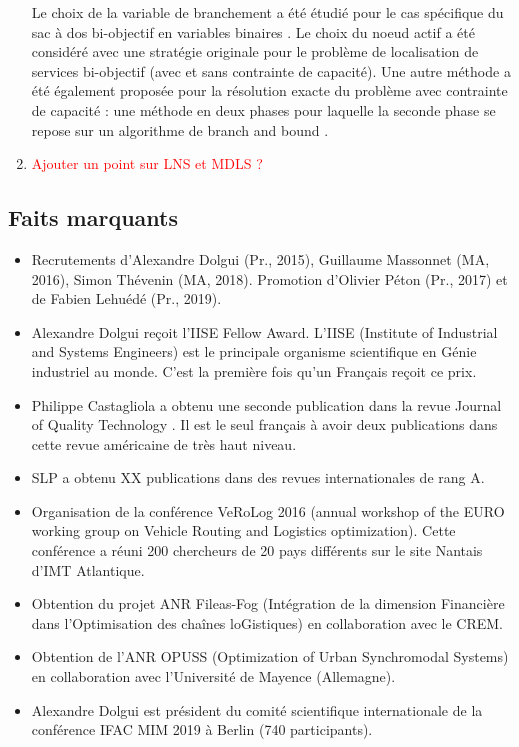 \begin{enumerate}
Le choix de la variable de branchement a été étudié pour le cas spécifique du sac à dos bi-objectif en variables binaires \cite{cerqueus:hal-01564982}. Le choix du noeud actif a été considéré avec une stratégie originale pour le problème de localisation de services bi-objectif \cite{delmee:hal-01435524} (avec et sans contrainte de capacité). Une autre méthode a  été également proposée pour la résolution exacte du problème avec contrainte de capacité : une méthode en deux phases pour laquelle la seconde phase se repose sur un algorithme de branch and bound \cite{delmee:hal-02480176}. 

\item \textcolor{red}{Ajouter un point sur LNS et MDLS ?}
\end{enumerate}

  		
\subsection{Faits marquants}



\begin{itemize}
    \item Recrutements d'Alexandre Dolgui (Pr., 2015), Guillaume  Massonnet (MA, 2016), Simon  Thévenin (MA, 2018). Promotion  d'Olivier Péton (Pr., 2017) et de Fabien Lehuédé (Pr., 2019).
    \item Alexandre Dolgui reçoit l'IISE Fellow Award. L'IISE (Institute of Industrial and Systems Engineers) est le principale organisme scientifique en Génie industriel au monde. C'est la première fois qu'un Français reçoit ce prix.
    \item Philippe Castagliola a obtenu une seconde publication dans la revue Journal of Quality Technology \cite{castagliola:hal-02002980}. Il est le seul français à avoir deux publications dans cette revue américaine de très haut niveau.
    \item SLP a obtenu XX publications  dans des revues internationales de rang A.
    \item Organisation de la conférence VeRoLog 2016 (annual workshop of the EURO working group on Vehicle Routing and Logistics optimization). Cette conférence a réuni 200 chercheurs de 20 pays différents sur le site Nantais d'IMT Atlantique. 
    \item Obtention du projet ANR Fileas-Fog (Intégration de la dimension Financière dans l’Optimisation des chaînes loGistiques) en collaboration avec le CREM.
    \item Obtention de l'ANR OPUSS (Optimization of Urban Synchromodal Systems) en collaboration avec l'Université de Mayence (Allemagne).
    \item Alexandre Dolgui est président du comité scientifique internationale de la conférence IFAC MIM 2019 à Berlin (740 participants). 
\end{itemize}


